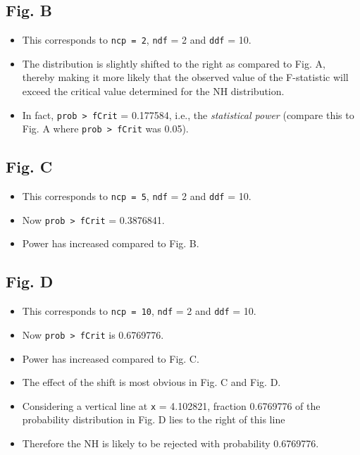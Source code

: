 \documentclass[
]{book}
\providecommand{\tightlist}{%
  \setlength{\itemsep}{0pt}\setlength{\parskip}{0pt}}
\begin{document}
\hypertarget{fig.-b}{%
\subsection{Fig. B}\label{fig.-b}}

\begin{itemize}
\tightlist
\item
  This corresponds to \texttt{ncp\ =\ 2}, \texttt{ndf} = 2 and \texttt{ddf} = 10.
\item
  The distribution is slightly shifted to the right as compared to Fig. A, thereby making it more likely that the observed value of the F-statistic will exceed the critical value determined for the NH distribution.
\item
  In fact, \texttt{prob\ \textgreater{}\ fCrit} = 0.177584, i.e., the \emph{statistical power} (compare this to Fig. A where \texttt{prob\ \textgreater{}\ fCrit} was 0.05).
\end{itemize}

\hypertarget{fig.-c}{%
\subsection{Fig. C}\label{fig.-c}}

\begin{itemize}
\tightlist
\item
  This corresponds to \texttt{ncp\ =\ 5}, \texttt{ndf} = 2 and \texttt{ddf} = 10.
\item
  Now \texttt{prob\ \textgreater{}\ fCrit} = 0.3876841.
\item
  Power has increased compared to Fig. B.
\end{itemize}

\hypertarget{fig.-d}{%
\subsection{Fig. D}\label{fig.-d}}

\begin{itemize}
\tightlist
\item
  This corresponds to \texttt{ncp\ =\ 10}, \texttt{ndf} = 2 and \texttt{ddf} = 10.
\item
  Now \texttt{prob\ \textgreater{}\ fCrit} is 0.6769776.
\item
  Power has increased compared to Fig. C.
\item
  The effect of the shift is most obvious in Fig. C and Fig. D.
\item
  Considering a vertical line at \texttt{x} = 4.102821, fraction 0.6769776 of the probability distribution in Fig. D lies to the right of this line
\item
  Therefore the NH is likely to be rejected with probability 0.6769776.
\end{itemize}
\end{document}
